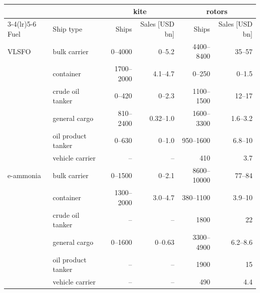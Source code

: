 \begin{tabular}{@{}llrrrr@{}}
\toprule
 & & \multicolumn{2}{c}{kite} & \multicolumn{2}{c}{rotors} \\
\cmidrule(lr){3-4}\cmidrule(lr){5-6}
Fuel & Ship type & Ships & Sales [USD bn] & Ships & Sales [USD bn] \\
\midrule
VLSFO & bulk carrier & 0--\num{4000} & 0--\num{5.2} & \num{4400}--\num{8400} & \num{35}--\num{57} \\
 & container & \num{1700}--\num{2000} & \num{4.1}--\num{4.7} & 0--\num{250} & 0--\num{1.5} \\
 & crude oil tanker & 0--\num{420} & 0--\num{2.3} & \num{1100}--\num{1500} & \num{12}--\num{17} \\
 & general cargo & \num{810}--\num{2400} & \num{0.32}--\num{1.0} & \num{1600}--\num{3300} & \num{1.6}--\num{3.2} \\
 & oil product tanker & 0--\num{630} & 0--\num{1.0} & \num{950}--\num{1600} & \num{6.8}--\num{10} \\
 & vehicle carrier & -- & -- & \num{410} & \num{3.7} \\
\midrule
e-ammonia & bulk carrier & 0--\num{1500} & 0--\num{2.1} & \num{8600}--\num{10000} & \num{77}--\num{84} \\
 & container & \num{1300}--\num{2000} & \num{3.0}--\num{4.7} & \num{380}--\num{1100} & \num{3.9}--\num{10} \\
 & crude oil tanker & -- & -- & \num{1800} & \num{22} \\
 & general cargo & 0--\num{1600} & 0--\num{0.63} & \num{3300}--\num{4900} & \num{6.2}--\num{8.6} \\
 & oil product tanker & -- & -- & \num{1900} & \num{15} \\
 & vehicle carrier & -- & -- & \num{490} & \num{4.4} \\
\bottomrule
\end{tabular}
